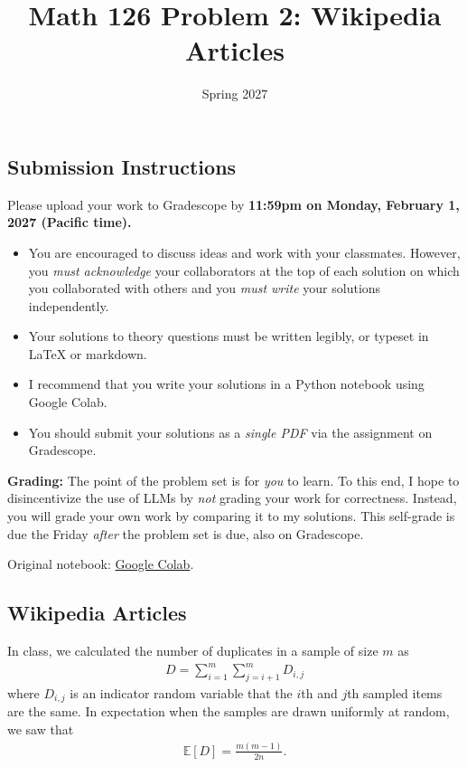 \documentclass{article}
\title{Math 126 Problem 2: Wikipedia Articles}
\author{} %
\date{Spring 2027}
\begin{document}
\maketitle

\hypertarget{submission-instructions}{%
\subsection*{Submission Instructions}\label{submission-instructions}}

Please upload your work to Gradescope by \textbf{11:59pm on Monday, February 1, 2027 (Pacific time).}

\begin{itemize}
\item
  You are encouraged to discuss ideas and work with your classmates. However, you \emph{must acknowledge} your collaborators at the top of each solution on which you collaborated with others and you \emph{must write} your solutions independently.
\item
  Your solutions to theory questions must be written legibly, or typeset in LaTeX or markdown.
\item
  I recommend that you write your solutions in a Python notebook using Google Colab.
\item
  You should submit your solutions as a \emph{single PDF} via the assignment on Gradescope.
\end{itemize}

\textbf{Grading:} The point of the problem set is for \emph{you} to learn. To this end, I hope to disincentivize the use of LLMs by \emph{not} grading your work for correctness. Instead, you will grade your own work by comparing it to my solutions. This self-grade is due the Friday \emph{after} the problem set is due, also on Gradescope.

\noindent Original notebook: \href{https://colab.research.google.com/drive/1gaNqPQmEDnXKQVemAYGs1sATgQe2xpHK?usp=sharing}{Google Colab}.

\hypertarget{wikipedia-articles}{%
\subsection*{Wikipedia Articles}\label{wikipedia-articles}}

In class, we calculated the number of duplicates in a sample of size \(m\) as \begin{align*}
D = \sum_{i=1}^m \sum_{j=i+1}^m D_{i,j}
\end{align*} where \(D_{i,j}\) is an indicator random variable that the \(i\)th and \(j\)th sampled items are the same. In expectation when the samples are drawn uniformly at random, we saw that \begin{align*}
\mathbb{E}[D] = \frac{m (m-1)}{2 n}.
\end{align*}
\end{document}
